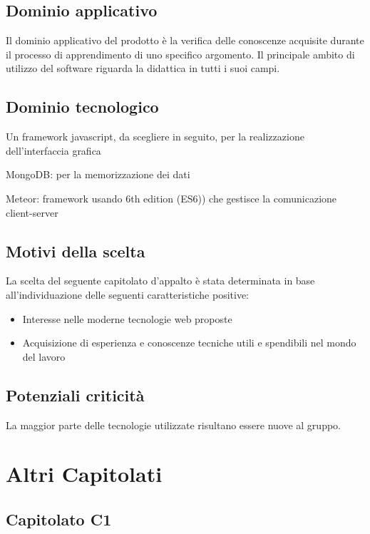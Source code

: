 \subsection{Dominio applicativo}
Il dominio applicativo del prodotto è la verifica delle conoscenze acquisite durante il processo di
apprendimento di uno specifico argomento. Il principale ambito di utilizzo del software riguarda
la didattica in tutti i suoi campi.


\subsection{Dominio tecnologico}
\begin{trivlist}
	\item  Un framework javascript, da scegliere in seguito, per la realizzazione dell’interfaccia grafica
	\item  MongoDB: per la memorizzazione dei dati
	\item  Meteor: framework  usando  6th edition (ES6)) che gestisce la comunicazione client-server
\end{trivlist}


\subsection{Motivi della scelta}

La scelta del seguente capitolato d’appalto è stata determinata in base all’individuazione delle
seguenti caratteristiche positive:
\begin{itemize}
	\item Interesse nelle moderne tecnologie web proposte
	\item Acquisizione di esperienza e conoscenze tecniche utili e spendibili nel mondo del lavoro
\end{itemize}


\subsection{Potenziali criticità}
La maggior parte delle tecnologie utilizzate risultano essere nuove al gruppo. 

\section{Altri Capitolati}

\subsection{Capitolato C1}

